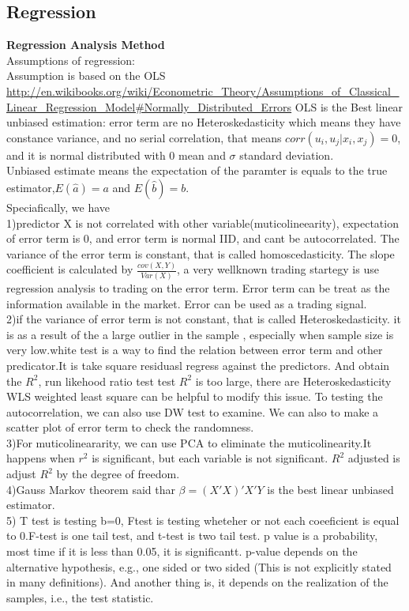 \documentclass[a4paper,11pt]{article}
\begin{document}
\subsection{Regression}
{\bf Regression Analysis Method}\\
Assumptions of regression:\\
Assumption is based on the OLS \url{http://en.wikibooks.org/wiki/Econometric_Theory/Assumptions_of_Classical_Linear_Regression_Model#Normally_Distributed_Errors}
OLS is the Best linear unbiased estimation: error term are no Heteroskedasticity which means they have constance variance, and no serial correlation, that means $corr(u_i,u_j|x_i,x_j)=0$, and it is normal distributed with 0 mean and $\sigma$ standard deviation.\\
Unbiased estimate means the expectation of the paramter is equals to the true estimator,$E(\hat{a})=a$ and $E(\hat{b})=b$.\\
Speciafically, we have\\
 1)predictor X is not correlated with other variable(muticolineearity), expectation of error term is 0, and error term is normal IID, and cant be autocorrelated. The variance of the error term is constant, that is called homoscedasticity. The slope coefficient is calculated by $\frac{cov(X,Y)}{Var(X)}$, a very wellknown trading startegy is use regression analysis to trading on the error term. Error term can be treat as the information available in the market. Error can be used as a trading signal.\\
2)if the variance of error term is not constant, that is called Heteroskedasticity. it is as a result of the a large outlier in the sample , especially when sample size is very low.white test is a way to find the relation between error term and other predicator.It is take square residuasl regress against the predictors. And obtain the $R^2$, run likehood ratio test test $R^2$ is too large, there are Heteroskedasticity
WLS weighted least square can be helpful to modify this issue.
To testing the autocorrelation, we can also use DW test to examine. We can also to make a scatter plot of error term to check the randomness. \\
3)For muticolineararity, we can use PCA to eliminate the muticolinearity.It happens when $r^2$ is significant, but each variable is not significant. $R^2$ adjusted is adjust $R^2$ by the degree of freedom. \\

4)Gauss Markov theorem said thar $\beta=(X'X)' X'Y$ is the best linear unbiased estimator.\\
5) T test is testing b=0, Ftest is testing wheteher or not each coeeficient is equal to 0.F-test is one tail test, and t-test is two tail test. p value is a probability, most time if it is less than 0.05, it is significantt.
p-value depends on the alternative hypothesis, e.g., one sided or two sided (This is not explicitly stated in
many definitions). And another thing is, it depends on the realization of the samples, i.e., the test statistic.
\end{document}
